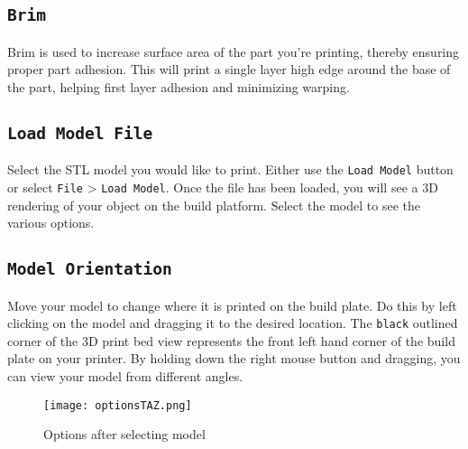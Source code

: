 \subsection{\texttt{Brim}}
Brim is used to increase surface area of the part you're printing, thereby ensuring proper part adhesion. This will print a single layer high edge around the base of the part, helping first layer adhesion and minimizing warping.

\subsection{\texttt{Load Model File}}
Select the STL model you would like to print. Either use the \texttt{Load Model} button or select \texttt{File} > \texttt{Load Model}. Once the file has been loaded, you will see a 3D rendering of your object on the build platform. Select the model to see the various options. 

\subsection{\texttt{Model Orientation}}
Move your model to change where it is printed on the build plate. Do this by left clicking on the model and dragging it to the desired location. The \texttt{black} outlined corner of the 3D print bed view represents the front left hand corner of the build plate on your printer. By holding down the right mouse button and dragging, you can view your model from different angles. %
\begin{figure}[H]
\centering
\texttt{[image: optionsTAZ.png]}
\caption{Options after selecting model}
\label{fig:Orientation}
\end{figure}

